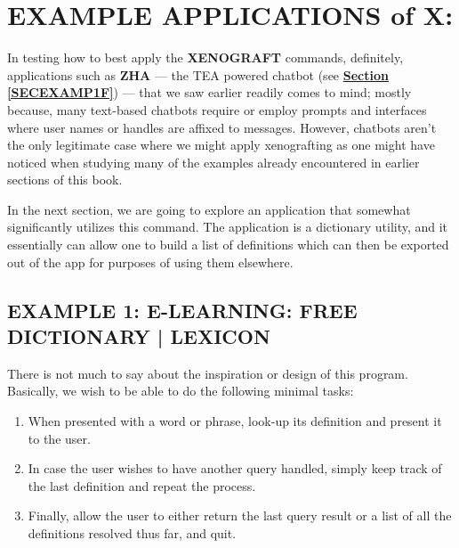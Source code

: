 \documentclass[a4paper, 18pt]{book} %
\begin{document}
{{{\section{EXAMPLE APPLICATIONS of X:}
\label{SECEXAMPX}

  
In testing how to best apply the \textbf{XENOGRAFT} commands, definitely, applications such as \textbf{ZHA} --- the TEA powered chatbot (see \textbf{\hyperref[SECEXAMP1F]{Section \ref{SECEXAMP1F}}}) --- that we saw earlier readily comes to mind; mostly because, many text-based chatbots require or employ prompts and interfaces where user names or handles are affixed to messages. However, chatbots aren't the only legitimate case where we might apply xenografting as one might have noticed when studying many of the examples already encountered in earlier sections of this book.


\vspace{2em}

In the next section, we are going to explore an application that somewhat significantly utilizes this command. The application is a dictionary utility, and it essentially can allow one to build a list of definitions which can then be exported out of the app for purposes of using them elsewhere.


\subsection{EXAMPLE 1: \textbf{E-LEARNING:} FREE DICTIONARY | LEXICON  }
\label{SECEXAMP1X}



There is not much to say about the inspiration or design of this program. Basically, we wish to be able to do the following minimal tasks:

\vspace{2em}

\begin{enumerate}
\item When presented with a word or phrase, look-up its definition and present it to the user.
\item In case the user wishes to have another query handled, simply keep track of the last definition and repeat the process.
\item Finally, allow the user to either return the last query result or a list of all the definitions resolved thus far, and quit.
\end{enumerate}

\vspace{2em}

}}}
\end{document}
